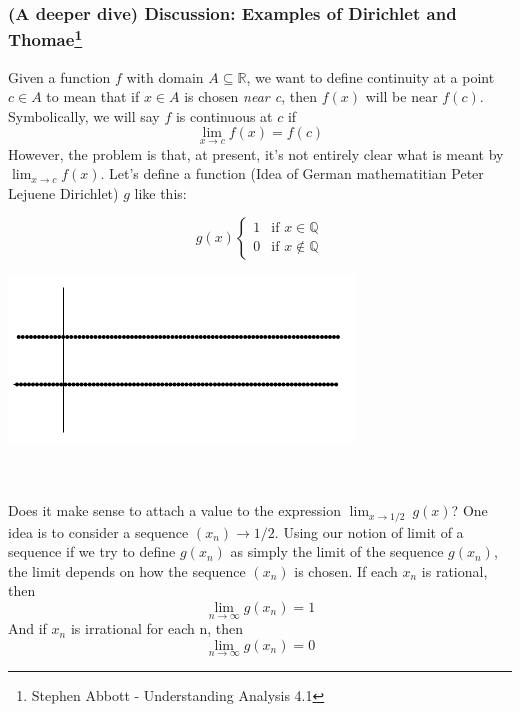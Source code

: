 \documentclass[12pt]{article}
\begin{document}
\subsubsection*{(A deeper dive) Discussion: Examples of Dirichlet and Thomae\footnote{Stephen Abbott - Understanding Analysis 4.1}}
Given a function $f$ with domain $A \subseteq \mathbb{R}$, we want to define continuity at a point $c \in A$ to mean that if $x \in A$ is chosen \textit{near c}, then $f(x)$ will be near $f(c)$. \\
Symbolically, we will say $f$ is continuous at $c$ if
$$ \lim_{x \to c} f(x) = f(c) $$
However, the problem is that, at present, it's not entirely clear what is meant by $ \lim_{x \to c} f(x) $. Let's define a function (Idea of German mathematitian Peter Lejuene Dirichlet) $g$ like this:\\
\begin{minipage}{0.45\textwidth}
    \begin{equation*}
        g(x)
        \begin{cases}
            1 & \text{if } x \in \mathbb{Q} \\
            0 & \text{if } x \notin \mathbb{Q}
        \end{cases}
    \end{equation*}
\end{minipage}
\begin{minipage}{0.45\textwidth}
    \centering
    \includegraphics[scale=0.4]{Dirichlet g_x.png}
\end{minipage} \\~\\
Does it make sense to attach a value to the expression $\lim_{x \to 1/2} \ g(x)$? One idea is to consider a sequence $(x_n) \to 1/2$. Using our notion of limit of a sequence if we try to define $g(x_n)$  as simply the limit of the sequence $g(x_n)$, the limit depends on how the sequence $(x_n)$ is chosen. If each $x_n$ is rational, then \[
    \lim_{n \to \infty} g(x_n) = 1
\]
And if $x_n$ is irrational for each n, then \[
    \lim_{n \to \infty} g(x_n) = 0
\]
\end{document}
